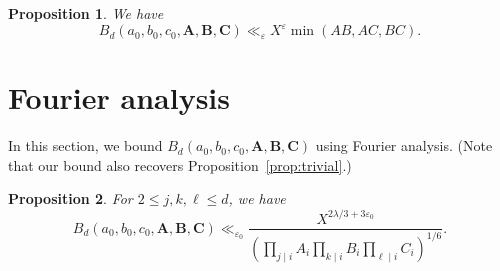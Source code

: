 \documentclass[a4paper,11pt,twoside,reqno]{amsart}
\def\Ab{\mathbf{A}}
\def\Bb{\mathbf{B}}
\def\Cb{\mathbf{C}}
\renewcommand{\le}{\leqslant}
\theoremstyle{plain}
\newtheorem{prop}{Proposition}
\theoremstyle{remark}
\numberwithin{prop}{section}
\numberwithin{equation}{section}
\begin{document}
\begin{prop}\label{prop:triv2}
    We have
    \[B_d(a_0,b_0,c_0,\Ab,\Bb,\Cb) \ll_{\varepsilon} X^{\varepsilon}\min(AB,AC,BC).\]
\end{prop}



\section{Fourier analysis}

In this section, we bound $B_d(a_0,b_0,c_0,\Ab,\Bb,\Cb)$ using Fourier analysis. (Note that our  bound also recovers 
Proposition~\ref{prop:trivial}.)

\begin{prop}\label{prop:fourierbound}
    For $2 \le j,k,\ell \le d$, we have
    \[B_d(a_0,b_0,c_0,\Ab,\Bb,\Cb) \ll_{\varepsilon_0} \frac{X^{2\lambda/3+3\varepsilon_0}}{\left(\prod_{j \mid i} A_i \prod_{k \mid i} B_i \prod_{\ell \mid i} C_i\right)^{1/6}}.\]
\end{prop}
\end{document}
